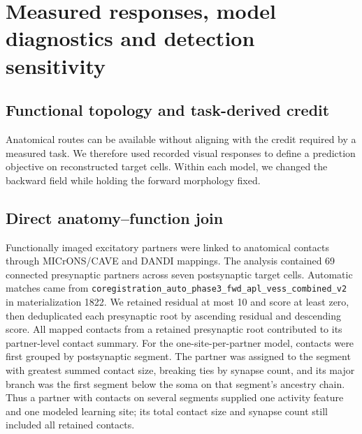 \section{Measured responses, model diagnostics and detection sensitivity}
\label{note:measured_responses}

\subsection{Functional topology and task-derived credit}
\label{note:functional}

Anatomical routes can be available without aligning with the credit required
by a measured task. We therefore used recorded visual responses to define a
prediction objective on reconstructed target cells. Within each model, we
changed the backward field while holding the forward morphology fixed.

\subsection{Direct anatomy--function join}

Functionally imaged excitatory partners were linked to anatomical contacts
through MICrONS/CAVE and DANDI mappings. The analysis contained 69 connected
presynaptic partners across seven postsynaptic target cells. Automatic
matches came from
\texttt{coregistration\_auto\_phase3\_fwd\_apl\_vess\_combined\_v2} in
materialization 1822. We retained residual at most 10 and score at least zero,
then deduplicated each presynaptic root by ascending residual and descending
score. All mapped contacts from a retained presynaptic root contributed to its
partner-level contact summary. For the one-site-per-partner model, contacts
were first grouped by postsynaptic segment. The partner was assigned to the
segment with greatest summed contact size, breaking ties by synapse count, and
its major branch was the first segment below the soma on that segment's
ancestry chain. Thus a partner with contacts on several segments supplied one
activity feature and one modeled learning site; its total contact size and
synapse count still included all retained contacts.

